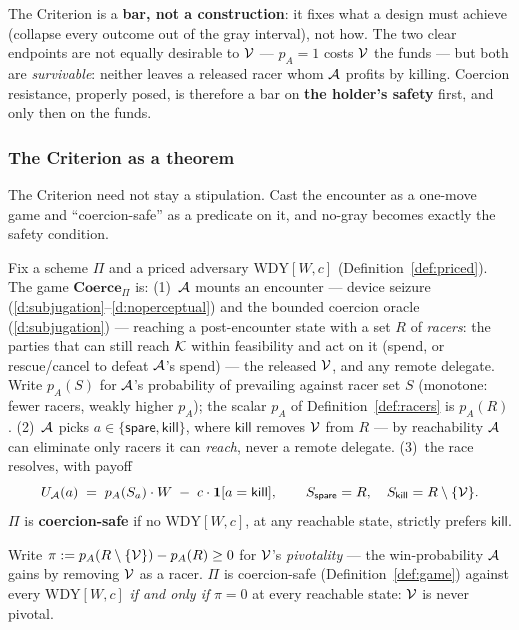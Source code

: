 \noindent The Criterion is a \textbf{bar, not a construction}: it fixes what a
design must achieve (collapse every outcome out of the gray interval), not how.
The two clear endpoints are not equally desirable to $\mathcal{V}$ --- $p_A = 1$ costs
$\mathcal{V}$ the funds --- but both are \emph{survivable}: neither leaves a released
racer whom $\mathcal{A}$ profits by killing. Coercion resistance, properly posed, is
therefore a bar on \textbf{the holder's safety} first, and only then on the funds.

\subsubsection*{The Criterion as a theorem}

The Criterion need not stay a stipulation. Cast the encounter as a one-move game
and ``coercion-safe'' as a predicate on it, and no-gray becomes exactly the
safety condition.

\begin{definition}\label{def:game}
Fix a scheme $\Pi$ and a priced adversary $\mathrm{WDY}[W,c]$
(Definition~\ref{def:priced}). The game $\mathbf{Coerce}_{\Pi}$ is:
(1)~$\mathcal{A}$ mounts an encounter --- device seizure (\ref{d:subjugation}--\ref{d:noperceptual}) and the bounded
coercion oracle (\ref{d:subjugation}) --- reaching a post-encounter state with a set $R$ of
\emph{racers}: the parties that can still reach $\mathcal{K}$ within feasibility and act on
it (spend, or rescue/cancel to defeat $\mathcal{A}$'s spend) --- the released
$\mathcal{V}$, and any remote delegate. Write $p_A(S)$ for $\mathcal{A}$'s probability
of prevailing against racer set $S$ (monotone: fewer racers, weakly higher
$p_A$); the scalar $p_A$ of Definition~\ref{def:racers} is $p_A(R)$.
(2)~$\mathcal{A}$ picks $a \in \{\textsf{spare}, \textsf{kill}\}$, where
$\textsf{kill}$ removes $\mathcal{V}$ from $R$ --- by reachability $\mathcal{A}$ can
eliminate only racers it can \emph{reach}, never a remote delegate.
(3)~the race resolves, with payoff
\[
  U_{\mathcal{A}}(a) \;=\; p_A(S_a)\cdot W \;-\; c\cdot\mathbf 1[a=\textsf{kill}],
  \qquad S_{\textsf{spare}} = R,\quad S_{\textsf{kill}} = R\setminus\{\mathcal{V}\}.
\]
$\Pi$ is \textbf{coercion-safe} if no $\mathrm{WDY}[W,c]$, at any reachable
state, strictly prefers $\textsf{kill}$.
\end{definition}

\begin{theorem}\label{thm:safety}
Write $\pi := p_A(R\setminus\{\mathcal{V}\}) - p_A(R) \ge 0$ for $\mathcal{V}$'s
\emph{pivotality} --- the win-probability $\mathcal{A}$ gains by removing $\mathcal{V}$
as a racer. $\Pi$ is coercion-safe (Definition~\ref{def:game}) against every
$\mathrm{WDY}[W,c]$ \emph{if and only if} $\pi = 0$ at every reachable state:
$\mathcal{V}$ is never pivotal.
\end{theorem}

